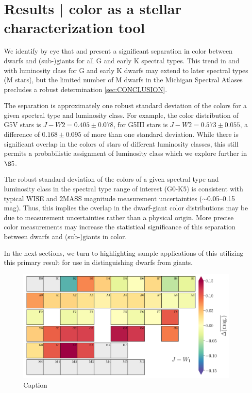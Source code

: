 \chapter{Results | color as a stellar characterization tool}\label{chap:RESULTS}

We identify by eye that \jwone and \jwtwo present a significant separation in color between dwarfs and (sub-)giants for all G and early K spectral types. This trend in \jwone and \jwtwo with luminosity class for G and early K dwarfs may extend to later spectral types (M stars), but the limited number of M dwarfs in the Michigan Spectral Atlases precludes a robust determination \ref{sec:CONCLUSION}.

The separation is approximately one robust standard deviation of the colors for a given spectral type and luminosity class. For example, the color distribution of G5V stars is $J-W2=0.405\pm0.078$, for G5III stars is $J-W2=0.573\pm0.055$, a difference of $0.168\pm0.095$ of more than one standard deviation. While there is significant overlap in the colors of stars of different luminosity classes, this still permits a probabilistic assignment of luminosity class which we explore further in ${\S}5$.

The robust standard deviation of the colors of a given spectral type and luminosity class in the spectral type range of interest (G0-K5) is consistent with typical WISE and 2MASS magnitude measurement uncertainties ($\sim$0.05--0.15 mag). Thus, this implies the overlap in the dwarf-giant color distributions may be due to measurement uncertainties rather than a physical origin.  More precise color measurements may increase the statistical significance of this separation between dwarfs and (sub-)giants in color.

In the next sections, we turn to highlighting sample applications of this utilizing this primary result for use in distinguishing dwarfs from giants.
\begin{figure}
    \centering
    \includegraphics[width=1.0\textwidth,clip=true]{Figures/periodic/periodic-delta_J_W1.png}
    \caption{Caption}
    \label{fig:periodic-delta-jw1}
\end{figure}

